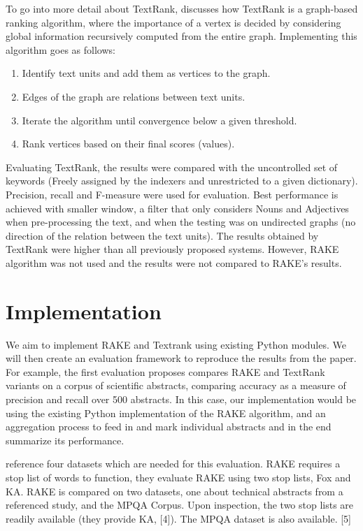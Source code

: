\documentclass[11pt,a4paper]{article}
\begin{document}
To go into more detail about TextRank, \citet{4} discusses how TextRank is a graph-based ranking algorithm, where the importance of a vertex is decided by considering global information recursively computed from the entire graph. Implementing this algorithm goes as follows:

\begin{enumerate}
\item Identify text units and add them as vertices to the graph.
\item Edges of the graph are relations between text units.
\item Iterate the algorithm until convergence below a given threshold. 
\item Rank vertices based on their final scores (values).
\end{enumerate}   

Evaluating TextRank, the results were compared with the uncontrolled set of keywords (Freely assigned by the indexers and unrestricted to a given dictionary). Precision, recall and F-measure were used for evaluation. Best performance is achieved with smaller window, a filter that only considers Nouns and Adjectives when pre-processing the text, and when the testing was on undirected graphs (no direction of the relation between the text units). The results obtained by TextRank were higher than all previously proposed systems. However, RAKE algorithm was not used and the results were not compared to RAKE’s results.

\section{Implementation}

We aim to implement RAKE and Textrank using existing Python modules. We will then create an evaluation framework to reproduce the results from the paper. For example, the first evaluation \citet{1} proposes compares RAKE and TextRank variants on a corpus of scientific abstracts, comparing accuracy as a measure of precision and recall over 500 abstracts. In this case, our implementation would be using the existing Python implementation of the RAKE algorithm, and an aggregation process to feed in and mark individual abstracts and in the end summarize its performance.

\citet{1} reference four datasets which are needed for this evaluation. RAKE requires a stop list of words to function, they evaluate RAKE using two stop lists, Fox and KA. RAKE is compared on two datasets, one about technical abstracts from a referenced study, and the MPQA Corpus. Upon inspection, the two stop lists are readily available (they provide KA, [4]). The MPQA dataset is also available. [5]
\end{document}

